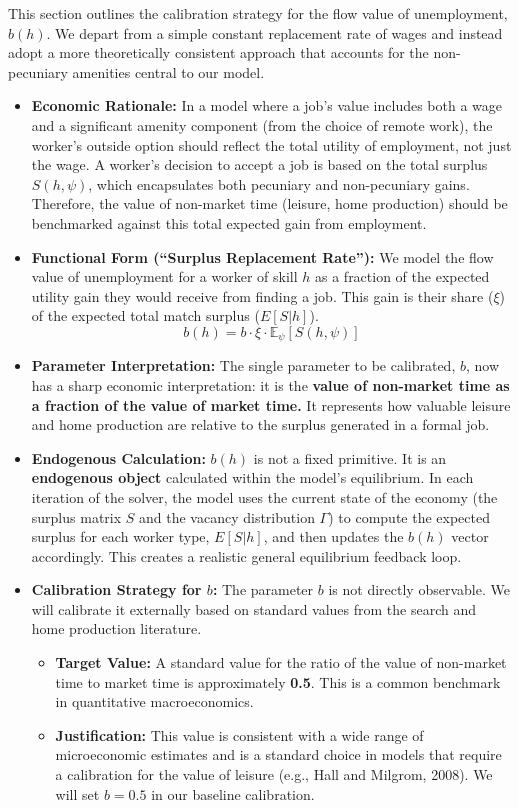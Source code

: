 \documentclass[
  11pt,
  letterpaper,
  DIV=11,
  numbers=noendperiod]{scrartcl}
\providecommand{\tightlist}{%
  \setlength{\itemsep}{0pt}\setlength{\parskip}{0pt}}\usepackage{longtable,booktabs,array}
\begin{document}
This section outlines the calibration strategy for the flow value of
unemployment, \(b(h)\). We depart from a simple constant replacement
rate of wages and instead adopt a more theoretically consistent approach
that accounts for the non-pecuniary amenities central to our model.

\begin{itemize}
\item
  \textbf{Economic Rationale:} In a model where a job's value includes
  both a wage and a significant amenity component (from the choice of
  remote work), the worker's outside option should reflect the total
  utility of employment, not just the wage. A worker's decision to
  accept a job is based on the total surplus \(S(h,\psi)\), which
  encapsulates both pecuniary and non-pecuniary gains. Therefore, the
  value of non-market time (leisure, home production) should be
  benchmarked against this total expected gain from employment.
\item
  \textbf{Functional Form (``Surplus Replacement Rate''):} We model the
  flow value of unemployment for a worker of skill \(h\) as a fraction
  of the expected utility gain they would receive from finding a job.
  This gain is their share (\(\xi\)) of the expected total match surplus
  (\(E[S|h]\)).
  \[ b(h) = b \cdot \xi \cdot \mathbb{E}_{\psi}[S(h, \psi)] \]
\item
  \textbf{Parameter Interpretation:} The single parameter to be
  calibrated, \(b\), now has a sharp economic interpretation: it is the
  \textbf{value of non-market time as a fraction of the value of market
  time.} It represents how valuable leisure and home production are
  relative to the surplus generated in a formal job.
\item
  \textbf{Endogenous Calculation:} \(b(h)\) is not a fixed primitive. It
  is an \textbf{endogenous object} calculated within the model's
  equilibrium. In each iteration of the solver, the model uses the
  current state of the economy (the surplus matrix \(S\) and the vacancy
  distribution \(\Gamma\)) to compute the expected surplus for each
  worker type, \(E[S|h]\), and then updates the \(b(h)\) vector
  accordingly. This creates a realistic general equilibrium feedback
  loop.
\item
  \textbf{Calibration Strategy for \(b\): } The parameter \(b\) is not
  directly observable. We will calibrate it externally based on standard
  values from the search and home production literature.

  \begin{itemize}
  \tightlist
  \item
    \textbf{Target Value:} A standard value for the ratio of the value
    of non-market time to market time is approximately \textbf{0.5}.
    This is a common benchmark in quantitative macroeconomics.
  \item
    \textbf{Justification:} This value is consistent with a wide range
    of microeconomic estimates and is a standard choice in models that
    require a calibration for the value of leisure (e.g., Hall and
    Milgrom, 2008). We will set \textbf{\(b = 0.5\)} in our baseline
    calibration.
  \end{itemize}
\end{itemize}
\end{document}
